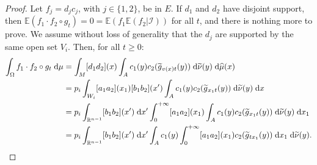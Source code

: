 \documentclass[10pt]{amsart}
\theoremstyle{definition}\newtheorem{defi}[theo]{Definition}\newtheorem{rema}[theo]{Remark}\newtheorem{exam}[theo]{Example}\newtheorem{exem}[theo]{Example}\newtheorem{nota}[theo]{Notation}
\newcommand{\R}{\mathbb{R}}
\newcommand{\Ebb}{\mathbb{E}}
\newcommand{\Ical}{\mathcal{I}}
\newcommand{\dd}{\;{\rm d}}
\let\oldtilde\tilde
\renewcommand*{\tilde}[1]{\mathchoice{\widetilde{#1}}{\widetilde{#1}}{\oldtilde{#1}}{\oldtilde{#1}}}\let\oldhat\hat
\renewcommand*{\hat}[1]{\mathchoice{\widehat{#1}}{\widehat{#1}}{\oldhat{#1}}{\oldhat{#1}}}\let\oldforall\forall
\renewcommand*{\forall}{\mathrel{\oldforall}}
\begin{document}
\begin{proof}
Let $f_j = d_j c_j$, with $j \in \{1,2\}$, be in $E$. If $d_1$ and $d_2$ have disjoint support, then $\Ebb (f_1 \cdot f_2 \circ g_t) = 0 = \Ebb (f_1 \Ebb (f_2| \Ical))$ for all $t$, and there is nothing more to prove. We assume without loss of generality that the $d_j$ are supported by the same open set $V_i$. Then, for all $t \geq 0$:
\begin{align*}
\int_\Omega f_1 \cdot f_2 \circ g_t \dd \mu & = \int_M [d_1 d_2] (x) \int_A c_1 (y) c_2 (\tilde{g}_{v(x)t} (y)) \dd \tilde{\nu} (y) \dd \hat{\mu} (x) \\
& = p_i \int_{W_i} [a_1 a_2] (x_1) [b_1 b_2] (x') \int_A c_1 (y) c_2 (\tilde{g}_{x_1 t} (y)) \dd \tilde{\nu} (y) \dd x \\
& = p_i \int_{\R^{n-1}} [b_1 b_2] (x') \dd x' \int_0^{+\infty} [a_1 a_2] (x_1) \int_A c_1 (y) c_2 (\tilde{g}_{x_1 t} (y)) \dd \tilde{\nu} (y) \dd x_1 \\
& = p_i \int_{\R^{n-1}} [b_1 b_2] (x') \dd x' \int_A c_1 (y) \int_0^{+\infty} [a_1 a_2] (x_1) c_2 (\tilde{g}_{t x_1} (y)) \dd x_1 \dd \tilde{\nu} (y).
\end{align*}


\end{proof}
\end{document}
